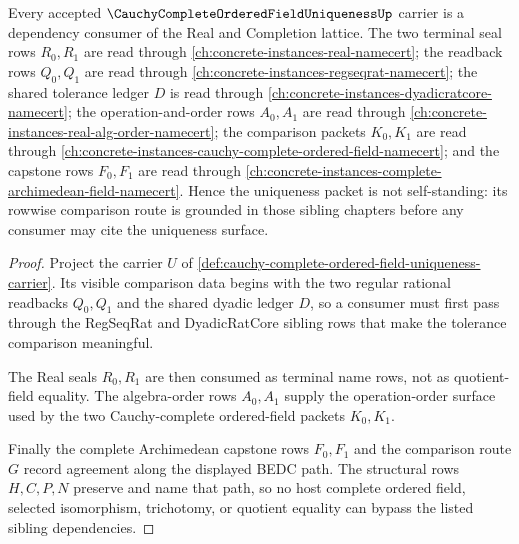 \begin{theorem}
\label{thm:cauchy-complete-ordered-field-uniqueness-sibling-dependency-route}
Every accepted $\CauchyCompleteOrderedFieldUniquenessUp$ carrier is a dependency consumer of the Real and Completion lattice. The two terminal seal rows $R_0,R_1$ are read through \autoref{ch:concrete-instances-real-namecert}; the readback rows $Q_0,Q_1$ are read through \autoref{ch:concrete-instances-regseqrat-namecert}; the shared tolerance ledger $D$ is read through \autoref{ch:concrete-instances-dyadicratcore-namecert}; the operation-and-order rows $A_0,A_1$ are read through \autoref{ch:concrete-instances-real-alg-order-namecert}; the comparison packets $K_0,K_1$ are read through \autoref{ch:concrete-instances-cauchy-complete-ordered-field-namecert}; and the capstone rows $F_0,F_1$ are read through \autoref{ch:concrete-instances-complete-archimedean-field-namecert}. Hence the uniqueness packet is not self-standing: its rowwise comparison route is grounded in those sibling chapters before any consumer may cite the uniqueness surface.
\end{theorem}
\begin{proof}
Project the carrier $U$ of \autoref{def:cauchy-complete-ordered-field-uniqueness-carrier}. Its visible comparison data begins with the two regular rational readbacks $Q_0,Q_1$ and the shared dyadic ledger $D$, so a consumer must first pass through the RegSeqRat and DyadicRatCore sibling rows that make the tolerance comparison meaningful.

The Real seals $R_0,R_1$ are then consumed as terminal name rows, not as quotient-field equality. The algebra-order rows $A_0,A_1$ supply the operation-order surface used by the two Cauchy-complete ordered-field packets $K_0,K_1$.

Finally the complete Archimedean capstone rows $F_0,F_1$ and the comparison route $G$ record agreement along the displayed BEDC path. The structural rows $H,C,P,N$ preserve and name that path, so no host complete ordered field, selected isomorphism, trichotomy, or quotient equality can bypass the listed sibling dependencies.
\end{proof}

